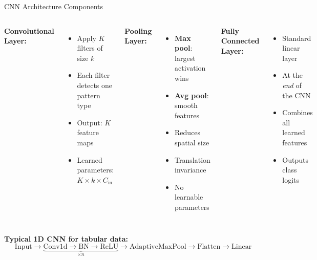 \documentclass[aspectratio=169]{beamer}
\begin{document}
\begin{frame}{CNN Architecture Components}

\begin{columns}
\textbf{Convolutional Layer:}
\begin{itemize}
    \item Apply $K$ filters of size $k$
    \item Each filter detects one pattern type
    \item Output: $K$ feature maps
    \item Learned parameters: $K \times k \times C_{\text{in}}$
\end{itemize}

\textbf{Pooling Layer:}
\begin{itemize}
    \item \textbf{Max pool}: largest activation wins
    \item \textbf{Avg pool}: smooth features
    \item Reduces spatial size
    \item Translation invariance
    \item No learnable parameters
\end{itemize}

\textbf{Fully Connected Layer:}
\begin{itemize}
    \item Standard linear layer
    \item At the \emph{end} of the CNN
    \item Combines all learned features
    \item Outputs class logits
\end{itemize}
\end{columns}

\vspace{0.4cm}
\textbf{Typical 1D CNN for tabular data:}
\[
\text{Input} \to \underbrace{\text{Conv1d} \to \text{BN} \to \text{ReLU}}_{\times n} \to \text{AdaptiveMaxPool} \to \text{Flatten} \to \text{Linear}
\]
\end{frame}
\end{document}
